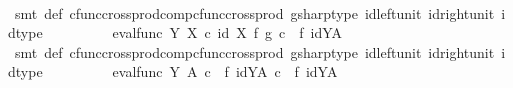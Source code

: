 \begin{isabellebody}
\ \ \ \ \ \ \isamarkupfalse%
\ {\isacharparenleft}{\kern0pt}smt\ {\isasympsi}{\isacharunderscore}{\kern0pt}def\ cfunc{\isacharunderscore}{\kern0pt}cross{\isacharunderscore}{\kern0pt}prod{\isacharunderscore}{\kern0pt}comp{\isacharunderscore}{\kern0pt}cfunc{\isacharunderscore}{\kern0pt}cross{\isacharunderscore}{\kern0pt}prod\ gsharp{\isacharunderscore}{\kern0pt}type\ id{\isacharunderscore}{\kern0pt}left{\isacharunderscore}{\kern0pt}unit{}\ id{\isacharunderscore}{\kern0pt}right{\isacharunderscore}{\kern0pt}unit{}\ id{\isacharunderscore}{\kern0pt}type{\isacharparenright}{\kern0pt}\isanewline
\ \ \ \ \isamarkupfalse%
\ \isamarkupfalse%
\ {\isachardoublequoteopen}{\isachardot}{\kern0pt}{\isachardot}{\kern0pt}{\isachardot}{\kern0pt}\ {\isacharequal}{\kern0pt}\ eval{\isacharunderscore}{\kern0pt}func\ Y\ X\ {\isasymcirc}\isactrlsub c\ {\isacharparenleft}{\kern0pt}id\ X\ {\isasymtimes}\isactrlsub f\ g\isactrlsup {\isasymsharp}{\isacharparenright}{\kern0pt}\ {\isasymcirc}\isactrlsub c\ {\isacharparenleft}{\kern0pt}{\isasympsi}\ {\isasymtimes}\isactrlsub f\ id{\isacharparenleft}{\kern0pt}Y\isactrlbsup A\isactrlesup {\isacharparenright}{\kern0pt}{\isacharparenright}{\kern0pt}{\isachardoublequoteclose}\isanewline
\ \ \ \ \ \ \isamarkupfalse%
\ {\isacharparenleft}{\kern0pt}smt\ {\isasympsi}{\isacharunderscore}{\kern0pt}def\ cfunc{\isacharunderscore}{\kern0pt}cross{\isacharunderscore}{\kern0pt}prod{\isacharunderscore}{\kern0pt}comp{\isacharunderscore}{\kern0pt}cfunc{\isacharunderscore}{\kern0pt}cross{\isacharunderscore}{\kern0pt}prod\ gsharp{\isacharunderscore}{\kern0pt}type\ id{\isacharunderscore}{\kern0pt}left{\isacharunderscore}{\kern0pt}unit{}\ id{\isacharunderscore}{\kern0pt}right{\isacharunderscore}{\kern0pt}unit{}\ id{\isacharunderscore}{\kern0pt}type{\isacharparenright}{\kern0pt}\isanewline
\ \ \ \ \isamarkupfalse%
\ \isamarkupfalse%
\ {\isachardoublequoteopen}{\isachardot}{\kern0pt}{\isachardot}{\kern0pt}{\isachardot}{\kern0pt}\ {\isacharequal}{\kern0pt}\ eval{\isacharunderscore}{\kern0pt}func\ Y\ A\ {\isasymcirc}\isactrlsub c\ {\isacharparenleft}{\kern0pt}{\isasymphi}\ {\isasymtimes}\isactrlsub f\ id{\isacharparenleft}{\kern0pt}Y\isactrlbsup A\isactrlesup {\isacharparenright}{\kern0pt}{\isacharparenright}{\kern0pt}\ {\isasymcirc}\isactrlsub c\ {\isacharparenleft}{\kern0pt}{\isasympsi}\ {\isasymtimes}\isactrlsub f\ id{\isacharparenleft}{\kern0pt}Y\isactrlbsup A\isactrlesup {\isacharparenright}{\kern0pt}{\isacharparenright}{\kern0pt}{\isachardoublequoteclose}\isanewline

\end{isabellebody}
